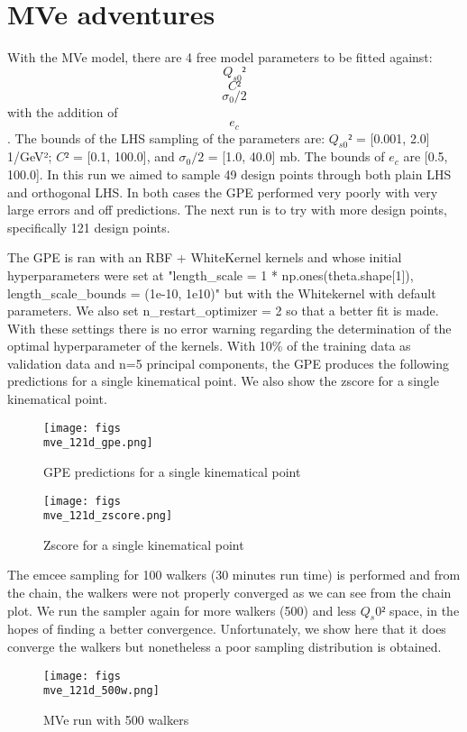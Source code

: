 \documentclass{article}
\begin{document}
\section{MVe adventures}

With the MVe model, there are 4 free model parameters to be fitted against: $$Q_{s0}²$$ $$C²$$ $$\sigma_{0}/2$$ with the addition of $$e_c$$. The bounds of the LHS sampling of the parameters are: $Q_{s0}²$ = [0.001, 2.0] 1/GeV²; $C²$ = [0.1, 100.0], and $\sigma_{0}/2$ = [1.0, 40.0] mb. The bounds of $e_c$ are [0.5, 100.0]. In this run we aimed to sample 49 design points through both plain LHS and orthogonal LHS. In both cases the GPE performed very poorly with very large errors and off predictions. The next run is to try with more design points, specifically 121 design points.

The GPE is ran with an RBF + WhiteKernel kernels and whose initial hyperparameters were set at "length_scale = 1 * np.ones(theta.shape[1]), length_scale_bounds = (1e-10, 1e10)" but with the Whitekernel with default parameters. We also set n_restart_optimizer = 2 so that a better fit is made. With these settings there is no error warning regarding the determination of the optimal hyperparameter of the kernels. With 10\% of the training data as validation data and n=5 principal components, the GPE produces the following predictions for a single kinematical point. We also show  the zscore for a single kinematical point.

\begin{figure}[h]
\centering
\texttt{[image: figs\\mve\_121d\_gpe.png]}
\caption{GPE predictions for a single kinematical point}
\label{fig:mve_121d_gpe}
\end{figure}

\begin{figure}[h]
\centering
\texttt{[image: figs\\mve\_121d\_zscore.png]}
\caption{Zscore for a single kinematical point}
\label{fig:mve_121d_zscore}
\end{figure}

The emcee sampling for 100 walkers (30 minutes run time) is performed and from the chain, the walkers were not properly converged as we can see from the chain plot. We run the sampler again for more walkers (500) and less $Q_s0²$ space, in the hopes of finding a better convergence. Unfortunately, we show here that it does converge the walkers but nonetheless a poor sampling distribution is obtained. 

\begin{figure}[h]
\centering
\texttt{[image: figs\\mve\_121d\_500w.png]}
\caption{MVe run with 500 walkers}
\label{fig:mve_121d_500w}
\end{figure}
\end{document}

